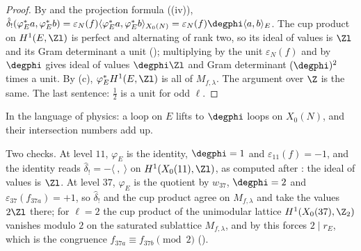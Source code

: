 \begin{proof}
By  and the projection formula ((iv)),
$\hat\delta_!(\varphi_E^*a,\varphi_E^*b)=\varepsilon_N(f)\langle\varphi_E^*a,\varphi_E^*b\rangle_{X_0(N)}=\varepsilon_N(f)\degphi\langle a,b\rangle_E$. The cup product on $H^1(E,\Zl)$ is perfect and alternating of rank two, so its
ideal of values is $\Zl$ and its Gram determinant a unit (); multiplying by the unit $\varepsilon_N(f)$ and by $\degphi$ gives ideal of values $\degphi\Zl$ and Gram determinant
$(\degphi)^2$ times a unit. By (c), $\varphi_E^*H^1(E,\Zl)$ is all of $M_{f,\lambda}$. The argument over $\Z$ is the same. The last sentence: $\frac12$ is a unit for odd
$\ell$.
\end{proof}

In the language of physics: a loop on $E$ lifts to $\degphi$ loops on $X_0(N)$, and their intersection numbers add up.

Two checks. At level $11$, $\varphi_E$ is the identity, $\degphi=1$ and $\varepsilon_{11}(f)=-1$, and the identity reads $\hat\delta_!=-\langle\ ,\ \rangle$ on $H^1(X_0(11),\Zl)$, as computed after
: the ideal of values is $\Zl$. At level $37$, $\varphi_E$ is the quotient by $w_{37}$, $\degphi=2$ and $\varepsilon_{37}(f_{37a})=+1$, so $\hat\delta_!$ and the cup product
agree on $M_{f,\lambda}$ and take the values $2\Zl$ there; for $\ell=2$ the cup product of the unimodular lattice $H^1(X_0(37),\Z_2)$ vanishes modulo $2$ on the saturated sublattice $M_{f,\lambda}$, and by
 this forces $2\mid r_E$, which is the congruence $f_{37a}\equiv f_{37b}\pmod2$ ().

